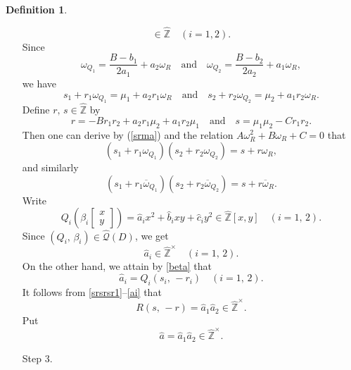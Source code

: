 \documentclass[reqno,11pt]{article}
\theoremstyle{plain} %
\theoremstyle{definition} %
\newtheorem{definition}[theorem]{\indent\sc Definition}
\begin{document}
\begin{definition}
\begin{enumerate}
\begin{equation*}
\in\widehat{\mathbb{Z}}\quad (i=1,2).
\end{equation*}
Since
\begin{equation*}
\omega_{Q_1}=\frac{B-b_1}{2a_1}+a_2\omega_R
\quad\textrm{and}\quad
\omega_{Q_2}=\frac{B-b_2}{2a_2}+a_1\omega_R,
\end{equation*}
we have
\begin{equation}\label{srma}
s_1+r_1\omega_{Q_1}=\mu_1+a_2r_1\omega_R
\quad\textrm{and}\quad
s_2+r_2\omega_{Q_2}=\mu_2+a_1r_2\omega_R.
\end{equation}
Define $r,\,s\in\widehat{\mathbb{Z}}$ by 
\begin{equation}\label{rands}
r=-Br_1r_2+a_2r_1\mu_2+a_1r_2\mu_1
\quad\textrm{and}\quad
s=\mu_1\mu_2-Cr_1r_2.
\end{equation}
Then one can derive by (\ref{srma}) and the relation 
$A\omega_R^2+B\omega_R+C=0$ that
\begin{equation}\label{srsrsr1}
(s_1+r_1\omega_{Q_1})(s_2+r_2\omega_{Q_2})=s+r\omega_R,
\end{equation}
and similarly 
\begin{equation}\label{srsrsr2}
(s_1+r_1\overline{\omega}_{Q_1})(s_2+r_2\overline{\omega}_{Q_2})=s+r\overline{\omega}_R.
\end{equation}
Write
\begin{equation}\label{Qbhat}
Q_i\left(\beta_i\begin{bmatrix}x\\y\end{bmatrix}\right)=
\widehat{a}_ix^2+\widehat{b}_ixy+\widehat{c}_iy^2
\in\widehat{\mathbb{Z}}[x,y]\quad(i=1,\,2).
\end{equation}
Since $(Q_i,\,\beta_i)\in\widehat{\mathcal{Q}}(D)$, we get
\begin{equation}\label{ai}
\widehat{a}_i\in\widehat{\mathbb{Z}}^\times\quad(i=1,\,2).
\end{equation}
On the other hand, we attain by \eqref{beta} that
\begin{equation*}
\widehat{a}_i=
Q_i(s_i,\,-r_i)\quad (i=1,\,2).
\end{equation*}
It follows from \eqref{srsrsr1}--\eqref{ai} that
\begin{equation}\label{unit}
R(s,\,-r)=\widehat{a}_1\widehat{a}_2\in\widehat{\mathbb{Z}}^\times. 
\end{equation}
Put
\begin{equation*}
\widehat{a}=\widehat{a}_1\widehat{a}_2\in\widehat{\mathbb{Z}}^\times.
\end{equation*}
\item[Step 3.]

\end{enumerate}
\end{definition}
\end{document}
